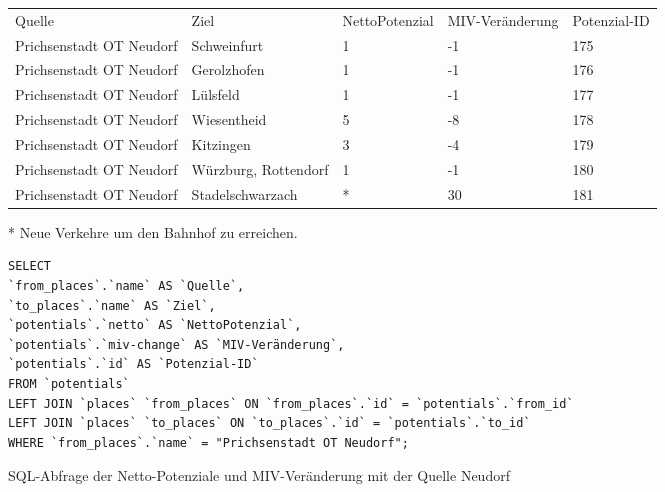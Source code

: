 \begin{tabular}{ l  l  l  l  l }
Quelle & Ziel & NettoPotenzial & MIV-Veränderung & Potenzial-ID\\ 
Prichsenstadt OT Neudorf & Schweinfurt & 1 & -1 & 175\\ 
Prichsenstadt OT Neudorf & Gerolzhofen & 1 & -1 & 176\\ 
Prichsenstadt OT Neudorf & Lülsfeld & 1 & -1 & 177\\ 
Prichsenstadt OT Neudorf & Wiesentheid & 5 & -8 & 178\\ 
Prichsenstadt OT Neudorf & Kitzingen & 3 & -4 & 179\\ 
Prichsenstadt OT Neudorf & Würzburg, Rottendorf & 1 & -1 & 180\\ 
Prichsenstadt OT Neudorf & Stadelschwarzach & * & 30 & 181\\ 
\end{tabular}
\newline
\newline
* Neue Verkehre um den Bahnhof zu erreichen.
\newline
\begin{listing}[htbp]
\begin{verbatim}
SELECT
`from_places`.`name` AS `Quelle`, 
`to_places`.`name` AS `Ziel`, 
`potentials`.`netto` AS `NettoPotenzial`, 
`potentials`.`miv-change` AS `MIV-Veränderung`, 
`potentials`.`id` AS `Potenzial-ID`
FROM `potentials`
LEFT JOIN `places` `from_places` ON `from_places`.`id` = `potentials`.`from_id`
LEFT JOIN `places` `to_places` ON `to_places`.`id` = `potentials`.`to_id`
WHERE `from_places`.`name` = "Prichsenstadt OT Neudorf";
\end{verbatim}
\caption{SQL-Abfrage der Netto-Potenziale und MIV-Veränderung mit der Quelle Neudorf}\label{lst-fz-neudorf}
\end{listing}